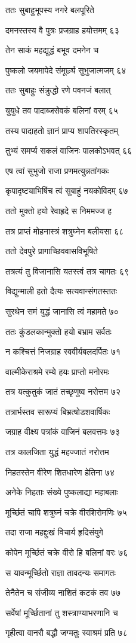 ततः सुबाहुभूपस्य नगरे बलपूरिते

दमनस्तस्य वै पुत्रः प्रजग्राह हयोत्तमम् ६३

तेन साकं महद्युद्धं बभूव दमनेन च

पुष्कलो जयमापेदे संमूर्छ्य सुभुजात्मजम् ६४

ततः सुबाहुः संक्रुद्धो रणे पवनजं बलात्

युयुधे तव पादाब्जसेवकं बलिनां वरम् ६५

तस्य पादाहतो ज्ञानं प्राप्य शापतिरस्कृतम्

तुभ्यं समर्प्य सकलं वाजिनः पालकोऽभवत् ६६

एष त्वां सुभुजो राजा प्रणमत्युन्नतांगकः

कृपादृष्ट्याभिषिंच त्वं सुबाहुं नयकोविदम् ६७

ततो मुक्तो हयो रेवाह्रदे स निममज्ज ह

तत्र प्राप्तं मोहनास्त्रं शत्रुघ्नेन बलीयसा ६८

ततो देवपुरे प्रागाच्छिववासविभूषिते

तत्रत्यं तु विजानासि यतस्त्वं तत्र चागतः ६९

विद्युन्माली हतो दैत्यः सत्यवान्संगतस्ततः

सुरथेन समं युद्धं जानासि त्वं महामते ७०

ततः कुंडलकान्मुक्तो हयो बभ्राम सर्वतः

न कश्चित्तं निजग्राह स्ववीर्यबलदर्पितः ७१

वाल्मीकेराश्रमे रम्ये हयः प्राप्तो मनोरमः

तत्र यत्कुतुकं जातं तच्छृणुष्व नरोत्तम ७२

तत्रार्भस्तव सारूप्यं बिभ्रत्षोडशवार्षिकः

जग्राह वीक्ष्य पत्रांकं वाजिनं बलवत्तमः ७३

तत्र कालजिता युद्धं महज्जातं नरोत्तम

निहतस्तेन वीरेण शितधारेण हेतिना ७४

अनेके निहताः संख्ये पुष्कलाद्या महाबलाः

मूर्च्छितं चापि शत्रुघ्नं चक्रे वीरशिरोमणिः ७५

तदा राजा महद्दुःखं विचार्य हृदिसंयुगे

कोपेन मूर्च्छितं चक्रे वीरो हि बलिनां वरः ७६

स यावन्मूर्च्छितो राज्ञा तावदन्यः समागतः

तेनैतेन च संजीव्य नाशितं कटकं तव ७७

सर्वेषां मूर्च्छितानां तु शस्त्राण्याभरणानि च

गृहीत्वा वानरौ बद्धौ जग्मतुः स्वाश्रमं प्रति ७८

